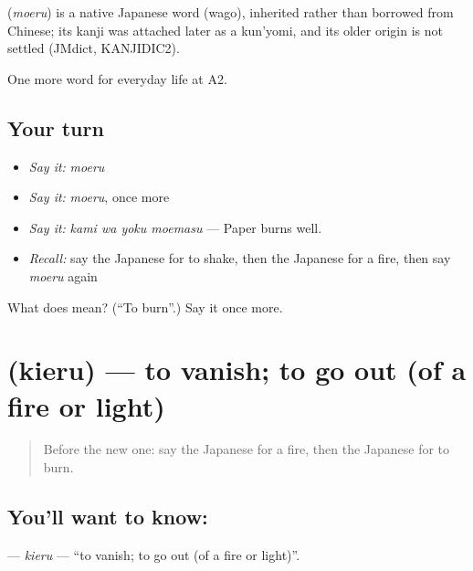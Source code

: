 \begin{cousinweb}
\textbf{} (\emph{moeru}) is a native Japanese word (wago), inherited rather than borrowed from Chinese; its kanji was attached later as a kun'yomi, and its older origin is not settled (JMdict, KANJIDIC2).
\end{cousinweb}

\begin{grammarlens}[title={What you've built}]
One more word for everyday life at A2.
\end{grammarlens}

\subsection*{Your turn}
\begin{itemize}
\raggedright
  \item \emph{Say it:} \emph{moeru}
  \item \emph{Say it:} \emph{moeru}, once more
  \item \emph{Say it:} \emph{kami wa yoku moemasu} — Paper burns well.
  \item \emph{Recall:} say the Japanese for to shake, then the Japanese for a fire, then say \emph{moeru} again
\end{itemize}

\begin{tcolorbox}[breakable,colback=teal!4,colframe=teal!35!black,title={Before you move on}]
What does  mean? (\textquotedblleft{}To burn\textquotedblright{}.) Say it once more.
\end{tcolorbox}
\section[\texorpdfstring{\ja{きえる} (kieru)}{きえる (kieru)}]{ (kieru) — to vanish; to go out (of a fire or light)}

\label{lesson:JA-C214-kieru}



\begin{quote}
Before the new one: say the Japanese for a fire, then the Japanese for to burn.
\end{quote}

\subsection*{You'll want to know: }
\textbf{} — \emph{kieru} — \textquotedblleft{}to vanish; to go out (of a fire or light)\textquotedblright{}.

